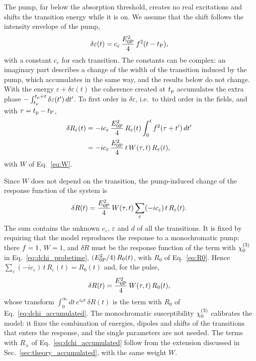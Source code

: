 \documentclass[aps,prb,reprint,superscriptaddress,amsmath,amssymb]{revtex4-2}
\begin{document}
The pump, far below the absorption threshold, creates no real excitations and shifts the transition energy while it is
on. We assume that the shift follows the intensity envelope of the pump,
\begin{equation}
\delta\varepsilon(t) = c_\varepsilon\,\frac{E_{0\mathrm{P}}^2}{4}\,f^2(t-t_{\mathrm{P}}) ,
\label{eq:shift}
\end{equation}
with a constant $c_\varepsilon$ for each transition. The constants can be complex: an imaginary part describes a change
of the width of the transition induced by the pump, which accumulates in the same way, and the results below do not
change. With the energy $\varepsilon+\delta\varepsilon(t)$ the coherence created at $t_{\mathrm{p}}$ accumulates the extra phase
$-\int_{t_{\mathrm{p}}}^{t_{\mathrm{p}}+t}\delta\varepsilon(t')\,dt'$. To first order in $\delta\varepsilon$, i.e.\ to third order in the
fields, and with $\tau = t_{\mathrm{p}}-t_{\mathrm{P}}$,
\begin{align}
\delta R_\varepsilon(t) &= -ic_\varepsilon\,\frac{E_{0\mathrm{P}}^2}{4}\,R_\varepsilon(t)\int_0^tf^2(\tau+t')\,dt'
\nonumber\\
&= -ic_\varepsilon\,\frac{E_{0\mathrm{P}}^2}{4}\,t\,W(\tau,t)\,R_\varepsilon(t) ,
\label{eq:dR_eps}
\end{align}
with $W$ of Eq.~\eqref{eq:W}.

Since $W$ does not depend on the transition, the pump-induced change of the response function of the system is
\begin{equation}
\delta R(t) = \frac{E_{0\mathrm{P}}^2}{4}\,W(\tau,t)\sum_\varepsilon(-ic_\varepsilon)\,t\,R_\varepsilon(t) .
\label{eq:dR_sum}
\end{equation}
The sum contains the unknown $c_\varepsilon$, $\varepsilon$ and $d$ of all the transitions. It is fixed by requiring
that the model reproduces the response to a monochromatic pump: there $f = 1$, $W = 1$, and $\delta R$ must be the
response function of the term with $\chi^{(3)}_{0}$ in Eq.~\eqref{eq:dchi_probetime}, $(E_{0\mathrm{P}}^2/4)\,R_0(t)$, with $R_0$ of
Eq.~\eqref{eq:R0}. Hence $\sum_\varepsilon(-ic_\varepsilon)\,t\,R_\varepsilon(t) = R_0(t)$ and, for the pulse,
\begin{equation}
\delta R(t) = \frac{E_{0\mathrm{P}}^2}{4}\,W(\tau,t)\,R_0(t) ,
\label{eq:dR}
\end{equation}
whose transform $\int_0^\infty dt\,e^{i\omega t}\,\delta R(t)$ is the term with $R_0$ of
Eq.~\eqref{eq:dchi_accumulated}. The monochromatic susceptibility $\chi^{(3)}_{0}$ calibrates the model: it fixes the
combination of energies, dipoles and shifts of the transitions that enters the response, and the single parameters are
not needed. The terms with $R_\pm$ of Eq.~\eqref{eq:dchi_accumulated} follow from the extension discussed in
Sec.~\ref{sec:theory_accumulated}, with the same weight $W$.
\end{document}
